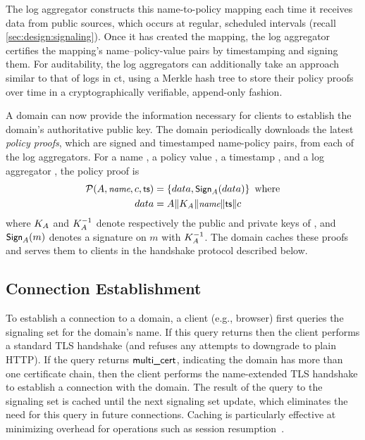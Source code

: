 The log aggregator constructs this name-to-policy mapping each time it receives
data from public sources, which 
occurs at regular, scheduled intervals (recall \autoref{sec:design:signaling}). 
Once it has created the mapping, the
log aggregator certifies the mapping's name--policy-value pairs by
timestamping and signing them. For auditability, the log aggregators
can additionally take an approach similar to that of logs in \ac{ct}, using a
Merkle hash tree to store their policy proofs over time in a cryptographically
verifiable, append-only fashion.

A domain can now provide the
information necessary for clients to establish the domain's authoritative public
key. The domain periodically downloads the latest \emph{policy proofs}, which
are signed and timestamped name-policy pairs, from each of the log aggregators.
For a name \hostname, a policy value \policy, a timestamp \timestamp, and a log
aggregator \logagg, the policy proof is 
\begin{align}
  \mathcal{P}(A, \small{\emph{name}}, c, \textsf{ts}) &= 
  \left\{data, \small{\textsf{Sign}}_{A}(data)\right\} \mbox{ where}
  \nonumber \\
  data &= A \| K_{A} \| \small{\emph{name}} \| \textsf{ts} \| c
\end{align}
where $K_{A}$ and $K_{A}^{-1}$ denote respectively the public
and private keys of \logagg, and $\small{\textsf{Sign}}_{A}(m)$ denotes a signature
on $m$ with $K_{A}^{-1}$. The domain caches these proofs and serves them
to clients in the handshake protocol described below.

\subsection{Connection Establishment}
\label{sec:design:handshake}

To establish a connection to a domain, a client (e.g., browser) first queries
the signaling set for the domain's name. If this query returns \onecert then the
client performs a standard TLS handshake (and refuses any attempts to downgrade
to plain HTTP). If the query returns $\textsf{multi\_cert}$, indicating the domain has
more than one certificate chain, then the client performs the \ac{name}-extended
TLS handshake to establish a connection with the domain. The result of the query
to the signaling set is cached until the next signaling set update, which
eliminates the need for this query in future connections. Caching is
particularly effective at minimizing overhead for operations such as session
resumption~\cite{rfc8446}.

